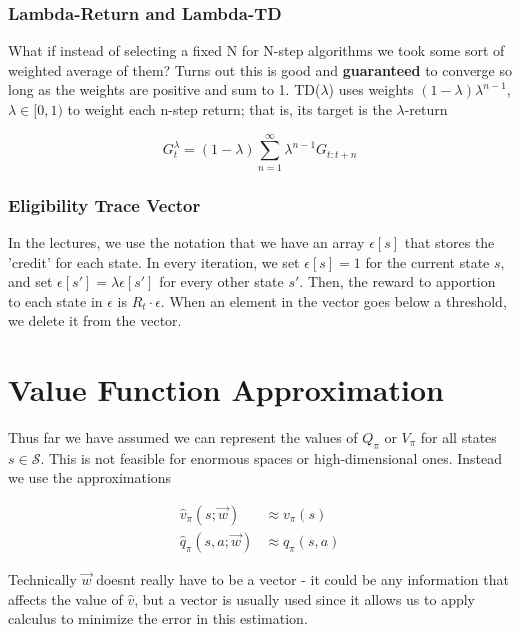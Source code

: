 \documentclass[11pt]{report}
\begin{document}
\subsection{Lambda-Return and Lambda-TD}

What if instead of selecting a fixed N for N-step algorithms we took some sort of weighted average of them? Turns out this is good and \textbf{guaranteed} to converge so long as the weights are positive and sum to 1. TD($\lambda$) uses weights $(1-\lambda)\lambda^{n-1}$, $\lambda \in [0, 1)$ to weight each n-step return; that is, its target is the $\lambda$-return

\begin{equation}
	\label{eqn:lambda-return}
	G_t^\lambda = (1-\lambda)\sum_{n=1}^\infty \lambda^{n-1} G_{t:t+n}
\end{equation}


\subsection{Eligibility Trace Vector}
In the lectures, we use the notation that we have an array $\epsilon[s]$ that stores the 'credit' for each state. In every iteration, we set $\epsilon[s]=1$ for the current state $s$, and set $\epsilon[s'] = \lambda\epsilon[s']$ for every other state $s'$. Then, the reward to apportion to each state in $\epsilon$ is $R_t \cdot \epsilon$. When an element in the vector goes below a threshold, we delete it from the vector.

\chapter{Value Function Approximation}\label{sec:vfa}
Thus far we have assumed we can represent the values of $Q_\pi$ or $V_\pi$ for all states $s \in \mathcal{S}$. This is not feasible for enormous spaces or high-dimensional ones. Instead we use the approximations

\begin{align}
	\label{eqn:vfa-state-value}
	\hat{v}_\pi(s ; \vec{w}) &\approx v_\pi(s)\\
	\hat{q}_\pi(s, a ; \vec{w}) &\approx q_\pi(s, a)
\end{align}

Technically $\vec{w}$ doesnt really have to be a vector - it could be any information that affects the value of $\hat{v}$, but a vector is usually used since it allows us to apply calculus to minimize the error in this estimation.
\end{document}

